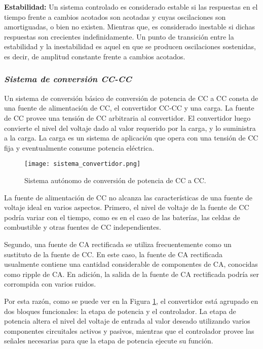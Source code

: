 \textbf{Estabilidad:} Un sistema controlado es considerado estable si las respuestas en el tiempo frente a cambios acotados son acotadas y cuyas oscilaciones son amortiguadas, 
o bien no existen. Mientras que, es considerado inestable si dichas respuestas son crecientes indefinidamente. Un punto de transición entre la estabilidad y la 
inestabilidad es aquel en que se producen oscilaciones sostenidas, es decir, de amplitud constante frente a cambios acotados. \parencite{ADAM}


\subsubsection*{\it{Sistema de conversión CC-CC}}
\vspace{-0.25cm}
Un sistema de conversión básico de conversión de potencia de CC a CC consta de una fuente de alimentación de CC, el convertidor CC-CC y una carga.
La fuente de CC provee una tensión de CC arbitraria al convertidor. El convertidor luego convierte el nivel del voltaje dado al valor requerido
por la carga, y lo suministra a la carga. La carga es un sistema de aplicación que opera con una tensión de CC fija y eventualmente consume potencia
eléctrica.

\begin{figure}[H]
    \centering
    \texttt{[image: sistema\_convertidor.png]}
    \vspace{-0.25cm}
    \caption{Sistema autónomo de conversión de potencia de CC a CC.}
    \label{fig:sistema_convertidor}
\end{figure}
\vspace{-0.5cm}

La fuente de alimentación de CC no alcanza las características de una fuente de voltaje ideal en varios aspectos.
Primero, el nivel de voltaje de la fuente de CC podría variar con el tiempo, como es en el caso de las baterías, las celdas de combustible y otras
fuentes de CC independientes.

Segundo, una fuente de CA rectificada se utiliza frecuentemente como un sustituto de la fuente de CC. En este caso, la fuente de CA rectificada
usualmente contiene una cantidad considerable de componentes de CA, conocidas como ripple de CA. En adición, la salida de la fuente de CA rectificada
podría ser corrompida con varios ruidos.

Por esta razón, como se puede ver en la Figura \ref{fig:sistema_convertidor}, el convertidor está agrupado en dos bloques funcionales: la etapa de potencia
y el controlador. La etapa de potencia altera el nivel del voltaje de entrada al valor deseado utilizando varios componentes circuitales activos y pasivos,
mientras que el controlador provee las señales necesarias para que la etapa de potencia ejecute su función.

